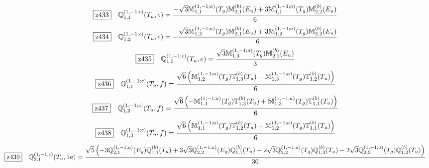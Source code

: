 \documentclass[fleqn,10pt,landscape]{jsarticle}
\begin{document}
\begin{dmath*}
\hspace*{3mm}\fbox{z433}\quad \mathbb{Q}_{1,1}^{(1,-1;c)}(T_{u},e)=\frac{- \sqrt{3} \mathbb{M}_{1,1}^{(1,-1;a)}(T_{g}) \mathbb{M}_{2,1}^{(b)}(E_{u}) + 3 \mathbb{M}_{1,1}^{(1,-1;a)}(T_{g}) \mathbb{M}_{2,2}^{(b)}(E_{u})}{6}
\end{dmath*}
\begin{dmath*}
\hspace*{3mm}\fbox{z434}\quad \mathbb{Q}_{1,2}^{(1,-1;c)}(T_{u},e)=- \frac{\sqrt{3} \mathbb{M}_{1,2}^{(1,-1;a)}(T_{g}) \mathbb{M}_{2,1}^{(b)}(E_{u}) + 3 \mathbb{M}_{1,2}^{(1,-1;a)}(T_{g}) \mathbb{M}_{2,2}^{(b)}(E_{u})}{6}
\end{dmath*}
\begin{dmath*}
\hspace*{3mm}\fbox{z435}\quad \mathbb{Q}_{1,3}^{(1,-1;c)}(T_{u},e)=\frac{\sqrt{3} \mathbb{M}_{1,3}^{(1,-1;a)}(T_{g}) \mathbb{M}_{2,1}^{(b)}(E_{u})}{3}
\end{dmath*}
\begin{dmath*}
\hspace*{3mm}\fbox{z436}\quad \mathbb{Q}_{1,1}^{(1,-1;c)}(T_{u},f)=\frac{\sqrt{6} \left(\mathbb{M}_{1,2}^{(1,-1;a)}(T_{g}) \mathbb{T}_{1,3}^{(b)}(T_{u}) - \mathbb{M}_{1,3}^{(1,-1;a)}(T_{g}) \mathbb{T}_{1,2}^{(b)}(T_{u})\right)}{6}
\end{dmath*}
\begin{dmath*}
\hspace*{3mm}\fbox{z437}\quad \mathbb{Q}_{1,2}^{(1,-1;c)}(T_{u},f)=\frac{\sqrt{6} \left(- \mathbb{M}_{1,1}^{(1,-1;a)}(T_{g}) \mathbb{T}_{1,3}^{(b)}(T_{u}) + \mathbb{M}_{1,3}^{(1,-1;a)}(T_{g}) \mathbb{T}_{1,1}^{(b)}(T_{u})\right)}{6}
\end{dmath*}
\begin{dmath*}
\hspace*{3mm}\fbox{z438}\quad \mathbb{Q}_{1,3}^{(1,-1;c)}(T_{u},f)=\frac{\sqrt{6} \left(\mathbb{M}_{1,1}^{(1,-1;a)}(T_{g}) \mathbb{T}_{1,2}^{(b)}(T_{u}) - \mathbb{M}_{1,2}^{(1,-1;a)}(T_{g}) \mathbb{T}_{1,1}^{(b)}(T_{u})\right)}{6}
\end{dmath*}
\begin{dmath*}
\hspace*{3mm}\fbox{z439}\quad \mathbb{Q}_{3,1}^{(1,-1;c)}(T_{u},1a)=\frac{\sqrt{5} \left(- 3 \mathbb{Q}_{2,1}^{(1,-1;a)}(E_{g}) \mathbb{Q}_{1,1}^{(b)}(T_{u}) + 3 \sqrt{3} \mathbb{Q}_{2,2}^{(1,-1;a)}(E_{g}) \mathbb{Q}_{1,1}^{(b)}(T_{u}) - 2 \sqrt{3} \mathbb{Q}_{2,2}^{(1,-1;a)}(T_{g}) \mathbb{Q}_{1,3}^{(b)}(T_{u}) - 2 \sqrt{3} \mathbb{Q}_{2,3}^{(1,-1;a)}(T_{g}) \mathbb{Q}_{1,2}^{(b)}(T_{u})\right)}{30}
\end{dmath*}
\end{document}
